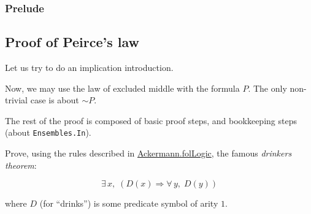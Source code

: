 \subsubsection{Prelude}



\subsection{Proof of Peirce's law}



Let us try to do an implication introduction.


Now, we may use the law of excluded middle with the formula $P$. The only non-trivial case is about $\sim P$.


The rest of the proof is composed of basic proof steps, 
and bookkeeping steps (about \texttt{Ensembles.In}).


\begin{exercise}
Prove, using the rules described in 
 \href{../theories/html/hydras.Ackermann.folLogic.html}{Ackermann.folLogic}, the famous \emph{drinkers theorem}:

$$\exists\,x,\; (D(x)\Longrightarrow \forall\,y,\; D(y))$$
\end{exercise}

where $D$ (for ``drinks'') is some predicate symbol of arity $1$.


